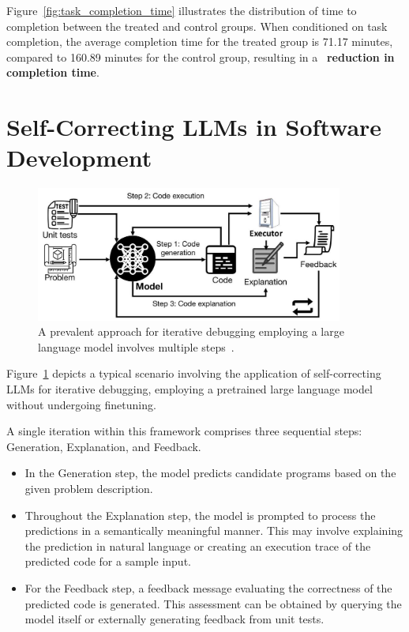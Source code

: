 \documentclass[a4paper,oneside]{book}
\begin{document}
Figure~\ref{fig:task_completion_time} illustrates the distribution of time to completion between the treated and control groups. When conditioned on task completion, the average completion time for the treated group is 71.17 minutes, compared to 160.89 minutes for the control group, resulting in a ~\textbf{reduction in completion time}.

\section{Self-Correcting LLMs in Software Development}
\begin{figure}[!htb]
  \centering
  \includegraphics[width=0.90\textwidth]{img/selfdebug}
  \caption{
    A prevalent approach for iterative debugging employing a large language model involves multiple steps~\cite{chen2023teaching}.}\label{fig:selfdebug}
\end{figure}

Figure~\ref{fig:selfdebug} depicts a typical scenario involving the application of self-correcting LLMs for iterative debugging, employing a pretrained large language model without undergoing finetuning.

A single iteration within this framework comprises three sequential steps: Generation, Explanation, and Feedback.

\begin{itemize}
  \item In the Generation step, the model predicts candidate programs based on the given problem description.

  \item Throughout the Explanation step, the model is prompted to process the predictions in a semantically meaningful manner. This may involve explaining the prediction in natural language or creating an execution trace of the predicted code for a sample input.

  \item For the Feedback step, a feedback message evaluating the correctness of the predicted code is generated. This assessment can be obtained by querying the model itself or externally generating feedback from unit tests.
\end{itemize}
\end{document}
